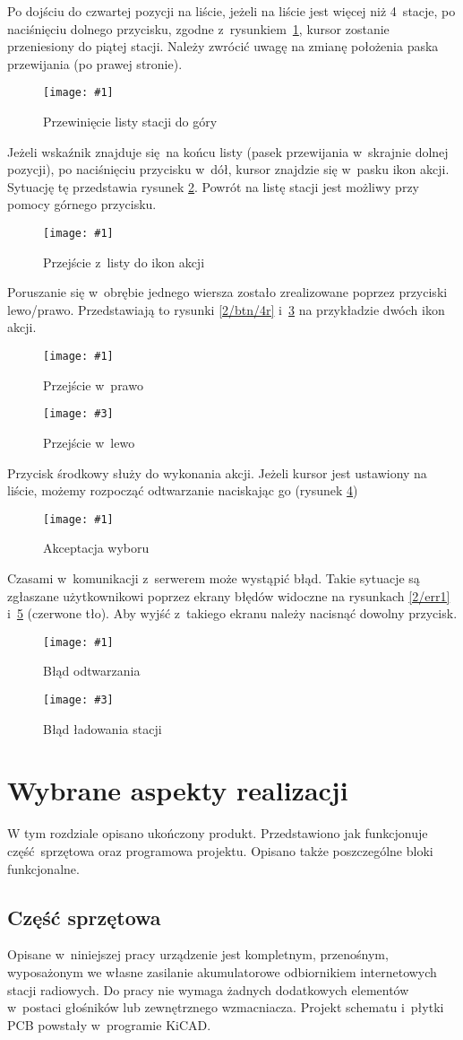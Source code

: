 \documentclass[polish]{aghengthesis}
\newcommand{\imgint}[4]{
	\begin{figure}[{#4}]
		\centering
		\texttt{[image: \#1]}
		\caption{#2}
		\label{#1}
	\end{figure}
}
\newcommand{\imgh}[3]{\imgint{#1}{#2}{#3}{H}}
\newcommand{\imgintss}[5]{
	\begin{figure}[{#5}]
		\centering
		\begin{minipage}{.45\textwidth}
			\centering
			\texttt{[image: \#1]}
			\caption{#2}
			\label{#1}
		\end{minipage}%
		\hfill
		\begin{minipage}{.45\textwidth}
			\centering
			\texttt{[image: \#3]}
			\caption{#4}
			\label{#3}
		\end{minipage}
	\end{figure}
}
\newcommand{\imghss}[4]{\imgintss{#1}{#2}{#3}{#4}{H}}
\begin{document}
		Po dojściu do czwartej pozycji na liście, jeżeli na liście jest więcej niż 4~stacje, po naciśnięciu dolnego przycisku, zgodne z~rysunkiem~\ref{2/btn/2}, kursor zostanie przeniesiony do piątej stacji. Należy zwrócić uwagę na zmianę położenia paska przewijania (po prawej stronie).
		\imgh{2/btn/2}{Przewinięcie listy stacji do góry}{0.7}
		
		Jeżeli wskaźnik znajduje się na końcu listy (pasek przewijania w~skrajnie dolnej pozycji), po naciśnięciu przycisku w~dół, kursor znajdzie się w~pasku ikon akcji. Sytuację tę przedstawia rysunek \ref{2/btn/3}. Powrót na listę stacji jest możliwy przy pomocy górnego przycisku.
		\imgh{2/btn/3}{Przejście z~listy do ikon akcji}{0.7}
		
		Poruszanie się w~obrębie jednego wiersza zostało zrealizowane poprzez przyciski \mbox{lewo/prawo}. Przedstawiają to rysunki \ref{2/btn/4r} i~\ref{2/btn/4l} na przykładzie dwóch ikon akcji.
		\imghss{2/btn/4r}{Przejście w~prawo}{2/btn/4l}{Przejście w~lewo}
		
		Przycisk środkowy służy do wykonania akcji. Jeżeli kursor jest ustawiony na liście, możemy rozpocząć odtwarzanie naciskając go (rysunek \ref{2/btn/5})
		\imgh{2/btn/5}{Akceptacja wyboru}{0.7}
				
		Czasami w~komunikacji z~serwerem może wystąpić błąd. Takie sytuacje są zgłaszane użytkownikowi poprzez ekrany błędów widoczne na rysunkach \ref{2/err1} i~\ref{2/err2} (czerwone tło). Aby wyjść z~takiego ekranu należy nacisnąć dowolny przycisk.
		\imghss{2/err1}{Błąd odtwarzania}{2/err2}{Błąd ładowania stacji}

\chapter{Wybrane aspekty realizacji}
	W tym rozdziale opisano ukończony produkt.
	Przedstawiono jak funkcjonuje część sprzętowa oraz programowa projektu. Opisano także poszczególne bloki funkcjonalne.
	
	\section{Część sprzętowa}
		\label{sec:hw}
		Opisane w~niniejszej pracy urządzenie jest kompletnym, przenośnym, wyposażonym we własne zasilanie akumulatorowe  odbiornikiem internetowych stacji radiowych. Do pracy nie wymaga żadnych dodatkowych elementów w~postaci głośników lub zewnętrznego wzmacniacza.
		Projekt schematu i~płytki PCB powstały w~programie KiCAD\textsuperscript{\cite{hw_kicad}}.
	
\end{document}
